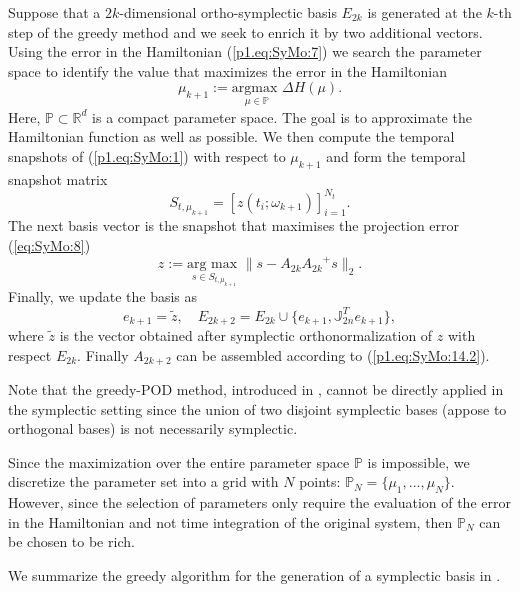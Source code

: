 Suppose that a $2k$-dimensional ortho-symplectic basis $E_{2k}$ is generated at the $k$-th step of the greedy method and we seek to enrich it by two additional vectors. Using the error in the Hamiltonian (\ref{p1.eq:SyMo:7}) we search the parameter space to identify the value that maximizes the error in the Hamiltonian
\begin{equation} \label{eq:SyMo:14.5}
	\mu_{k+1} := \underset{\mu\in \mathbb P}{\text{argmax }}\Delta H(\mu).
\end{equation}
Here, $\mathbb P \subset \mathbb R^{d}$ is a compact parameter space. The goal is to approximate the Hamiltonian function as well as possible. We then compute the temporal snapshots of (\ref{p1.eq:SyMo:1}) with respect to $\mu_{k+1}$ and form the temporal snapshot matrix
\begin{equation}
	S_{t,\mu_{k+1}}= [ z(t_i;\omega_{k+1}) ]_{i=1}^{N_t}.
\end{equation} 
The next basis vector is the snapshot that maximises the projection error (\ref{eq:SyMo:8}) 
\begin{equation} \label{eq:SyMo:14.6}
	z := \underset{s\in S_{t,\mu_{k+1}}}{\text{arg\ max }} \| s - A_{2k}{A_{2k}}^+s \|_2.
\end{equation}
Finally, we update the basis as
\begin{equation} \label{eq:SyMo:14.7}
	e_{k+1} = \tilde z, \quad E_{2k+2} = E_{2k}\cup \{ e_{k+1} , \mathbb J_{2n}^Te_{k+1} \},
\end{equation}
where $\tilde z$ is the vector obtained after symplectic orthonormalization of $z$ with respect $E_{2k}$. Finally $A_{2k+2}$ can be assembled according to (\ref{p1.eq:SyMo:14.2}).

Note that the greedy-POD method, introduced in , cannot be directly applied in the symplectic setting since the union of two disjoint symplectic bases (appose to orthogonal bases) is not necessarily symplectic.

Since the maximization over the entire parameter space $\mathbb P$ is impossible, we discretize the parameter set into a grid with $N$ points: $\mathbb P_N = \{ \mu_1,\dots,\mu_N\}$. However, since the selection of parameters only require the evaluation of the error in the Hamiltonian and not time integration of the original system, then $\mathbb P_N$ can be chosen to be rich. 

We summarize the greedy algorithm for the generation of a symplectic basis in .

